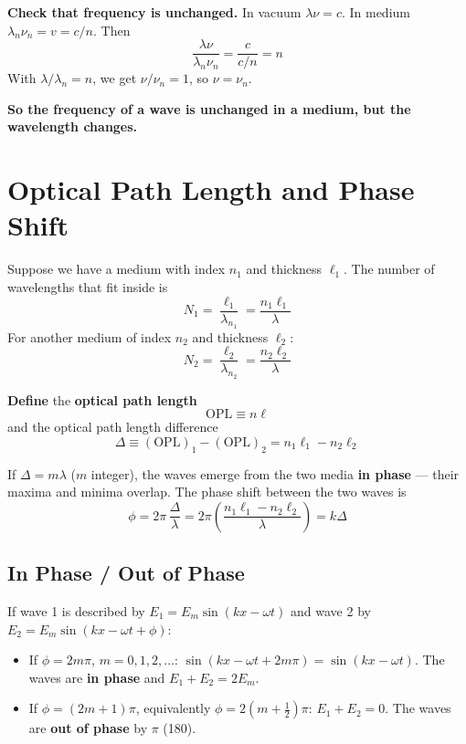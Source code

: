 \documentclass[11pt]{report}
\begin{document}
\textbf{Check that frequency is unchanged.} In vacuum $\lambda\nu = c$. In medium $\lambda_n \nu_n = v = c/n$. Then
\begin{equation}
\frac{\lambda \nu}{\lambda_n \nu_n} = \frac{c}{c/n} = n
\end{equation}
With $\lambda/\lambda_n = n$, we get $\nu/\nu_n = 1$, so $\nu = \nu_n$.

\textbf{So the frequency of a wave is unchanged in a medium, but the wavelength changes.}

\section{Optical Path Length and Phase Shift}

Suppose we have a medium with index $n_1$ and thickness $\ell_1$. The number of wavelengths that fit inside is
\begin{equation}
N_1 = \frac{\ell_1}{\lambda_{n_1}} = \frac{n_1 \ell_1}{\lambda}
\end{equation}
For another medium of index $n_2$ and thickness $\ell_2$:
\begin{equation}
N_2 = \frac{\ell_2}{\lambda_{n_2}} = \frac{n_2 \ell_2}{\lambda}
\end{equation}

\textbf{Define} the \textbf{optical path length}
\begin{equation}
\boxed{\mathrm{OPL} \equiv n\ell}
\end{equation}
and the optical path length difference
\begin{equation}
\boxed{\Delta \equiv (\mathrm{OPL})_1 - (\mathrm{OPL})_2 = n_1\ell_1 - n_2\ell_2}
\end{equation}

If $\Delta = m\lambda$ ($m$ integer), the waves emerge from the two media \textbf{in phase} --- their maxima and minima overlap. The phase shift between the two waves is
\begin{equation}
\boxed{\phi = 2\pi\,\frac{\Delta}{\lambda} = 2\pi\!\left(\frac{n_1\ell_1 - n_2\ell_2}{\lambda}\right) = k\Delta}
\end{equation}

\subsection*{In Phase / Out of Phase}

If wave 1 is described by $E_1 = E_m\sin(kx - \omega t)$ and wave 2 by $E_2 = E_m\sin(kx - \omega t + \phi)$:
\begin{itemize}
    \item If $\phi = 2m\pi$, $m = 0, 1, 2, \ldots$: $\sin(kx-\omega t + 2m\pi) = \sin(kx-\omega t)$. The waves are \textbf{in phase} and $E_1 + E_2 = 2E_m$.
    \item If $\phi = (2m+1)\pi$, equivalently $\phi = 2(m+\tfrac{1}{2})\pi$: $E_1 + E_2 = 0$. The waves are \textbf{out of phase} by $\pi$ (180\textdegree).
\end{itemize}
\end{document}
